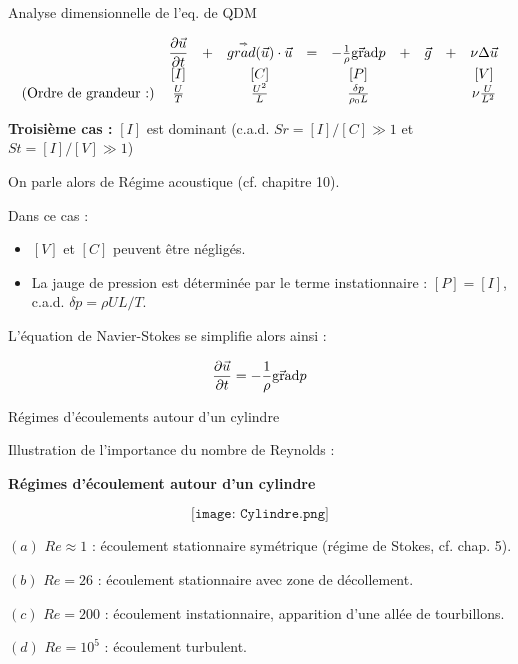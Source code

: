 \begin{frame}{Analyse dimensionnelle de l'eq. de QDM} 
\small

$$ 
\begin{array}{lccccccccc} 
\displaystyle
 &
\displaystyle \frac{\partial \vec{u}}{\partial t} & + &  \accentset{\Rightarrow}{grad} (\vec{u}) \cdot \vec{u} 
&=& 
 - \frac{1}{\rho}  \vec{\mbox{\rm gra}}\mbox{\rm d} p &+& \vec{g}  &+ & \nu \Delta \vec{u} 
 \\
\displaystyle
&
\left[I\right] && \left[ C \right] && \left[P\right]  && &&\left[V\right] 
\\
\displaystyle
\mbox{(Ordre de grandeur :)} &
\frac{U}{T}  && \frac{U^2}{L} && \frac{\delta p }{\rho_0 L} && && \nu \frac{U}{L^2}
\end{array}
$$


\pause
\bigskip


{\bf Troisième cas :} $[I]$ est dominant (c.a.d. $Sr = [I]/[C] \gg 1$ et $St = [I]/[V] \gg 1$) 
\pause
\smallskip

On parle alors de {\color{rouge} Régime acoustique} (cf. chapitre 10). 

\pause 
\medskip

Dans ce cas :

\begin{itemize}
\item $[V]$ et $[C]$  peuvent être négligés.

\item La jauge de pression est déterminée par le terme instationnaire : $[P] = [I]$, c.a.d. $\delta p = \rho U L / T$.  

\end{itemize}

L'équation de Navier-Stokes se simplifie alors ainsi :

$$
 \displaystyle \frac{\partial \vec{u}}{\partial t} 
= 
 - \frac{1}{\rho}  \vec{\mbox{\rm gra}}\mbox{\rm d} p 
$$

\smallskip
 

\end{frame}

\begin{frame}{Régimes d'écoulements autour d'un cylindre}

Illustration de l'importance du nombre de Reynolds :

\textbf{Régimes d'écoulement autour d'un cylindre}


\smallskip
$$
\texttt{[image: Cylindre.png]}
$$

$(a)$ \quad $Re\approx 1$ : écoulement stationnaire symétrique (régime de Stokes, cf. chap. 5).

$(b)$ \quad  $Re=26$ : écoulement stationnaire avec zone de décollement.

$(c)$ \quad $Re = 200$ : écoulement instationnaire, apparition d'une allée de tourbillons.

$(d)$ \quad $Re = 10^5$ : écoulement turbulent. 

\end{frame}





